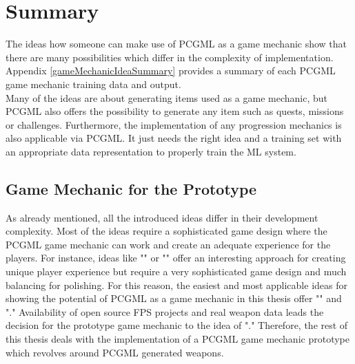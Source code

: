 \documentclass[MGS,Master,english]{twbook}%
\begin{document}
\section{Summary}
The ideas how someone can make use of PCGML as a game mechanic show that there are many possibilities which differ in the complexity of implementation. Appendix \ref{gameMechanicIdeaSummary} provides a summary of each PCGML game mechanic training data and output.\\
Many of the ideas are about generating items used as a game mechanic, but PCGML also offers the possibility to generate any item such as quests, missions or challenges. Furthermore, the implementation of any progression mechanics is also applicable via PCGML. It just needs the right idea and a training set with an appropriate data representation to properly train the ML system.

\subsection{Game Mechanic for the Prototype}
As already mentioned, all the introduced ideas differ in their development complexity. Most of the ideas require a sophisticated game design where the PCGML game mechanic can work and create an adequate experience for the players. For instance, ideas like "" or "" offer an interesting approach for creating unique player experience but require a very sophisticated game design and much balancing for polishing. For this reason, the easiest and most applicable ideas for showing the potential of PCGML as a game mechanic in this thesis offer "" and "." Availability of open source FPS projects and real weapon data leads the decision for the prototype game mechanic to the idea of "." Therefore, the rest of this thesis deals with the implementation of a PCGML game mechanic prototype which revolves around PCGML generated weapons.

%
%
\clearpage
\end{document}
